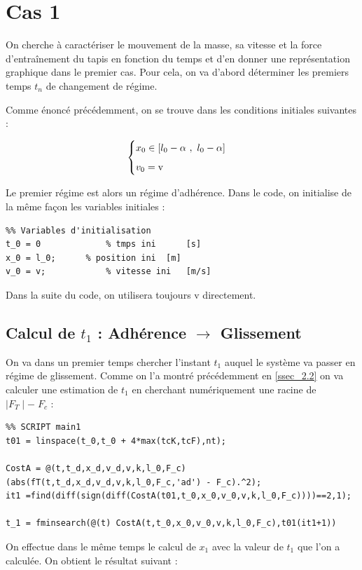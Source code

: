 \documentclass{article}
\newcommand{\ts}{\scriptscriptstyle}
\begin{document}
\newpage
\section{Cas 1}
On cherche à caractériser le mouvement de la masse, sa vitesse et la force d'entraînement du tapis en fonction du temps et d'en donner une représentation graphique dans le premier cas. Pour cela, on va d'abord déterminer les premiers temps $t_n$ de changement de régime.   
  
Comme énoncé précédemment, on se trouve dans les conditions initiales suivantes : 

$$
\begin{cases}
	\vspace{.2cm}
	x_0\in [l_0-\alpha~,~l_0-\alpha]\\
	v_0 = \text{v}
\end{cases}
$$

Le premier régime est alors un régime d'adhérence. Dans le code, on initialise de la même façon les variables initiales : 
\begin{lstlisting}
%% Variables d'initialisation
t_0 = 0 			% tmps ini		[s]
x_0 = l_0; 		% position ini	[m]
v_0 = v;			% vitesse ini	[m/s]       
\end{lstlisting}

Dans la suite du code, on utilisera toujours v directement. 


\subsection{Calcul de $t_1$ : Adhérence $\rightarrow$ Glissement}\label{ssec_3.1}
On va dans un premier temps chercher l'instant $t_1$ auquel le système va passer en régime de glissement. Comme on l'a montré précédemment en \ref{ssec_2.2} on va calculer une estimation de $t_1$ en cherchant numériquement une racine de $\mid F_{\ts T}\mid -\; F_c$ :

\begin{lstlisting}
%% SCRIPT main1
t01 = linspace(t_0,t_0 + 4*max(tcK,tcF),nt);

CostA = @(t,t_d,x_d,v_d,v,k,l_0,F_c) (abs(fT(t,t_d,x_d,v_d,v,k,l_0,F_c,'ad') - F_c).^2);
it1 =find(diff(sign(diff(CostA(t01,t_0,x_0,v_0,v,k,l_0,F_c))))==2,1);

t_1 = fminsearch(@(t) CostA(t,t_0,x_0,v_0,v,k,l_0,F_c),t01(it1+1))
\end{lstlisting}

On effectue dans le même temps le calcul de $x_1$ avec la valeur de $t_1$ que l'on a calculée. On obtient le résultat suivant :
\end{document}
